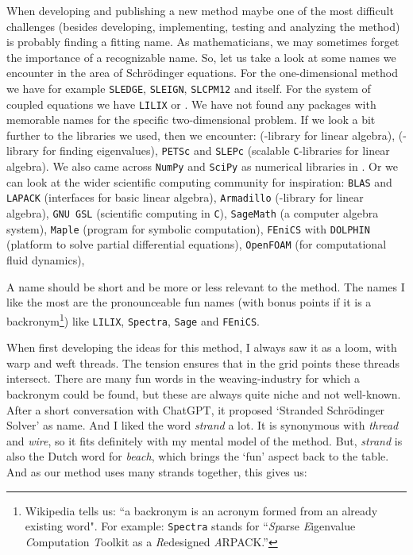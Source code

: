When developing and publishing a new method maybe one of the most difficult challenges (besides developing, implementing, testing and analyzing the method) is probably finding a fitting name. As mathematicians, we may sometimes forget the importance of a recognizable name. So, let us take a look at some names we encounter in the area of Schrödinger equations. For the one-dimensional method we have for example \texttt{SLEDGE}, \texttt{SLEIGN}, \texttt{SLCPM12} and \matslise{} itself. For the system of coupled equations we have \texttt{LILIX} or \matscs{}. We have not found any packages with memorable names for the specific two-dimensional problem. If we look a bit further to the libraries we used, then we encounter: \Eigen{} (\cpp{}-library for linear algebra), \spectra{} (\cpp{}-library for finding eigenvalues), \texttt{PETSc} and \texttt{SLEPc} (scalable \texttt{C}-libraries for linear algebra). We also came across \texttt{NumPy} and \texttt{SciPy} as numerical libraries in \lpython{}. Or we can look at the wider scientific computing community for inspiration: \texttt{BLAS} and \texttt{LAPACK} (interfaces for basic linear algebra), \texttt{Armadillo} (\cpp{}-library for linear algebra), \texttt{GNU GSL} (scientific computing in \texttt{C}), \texttt{SageMath} (a computer algebra system), \texttt{Maple} (program for symbolic computation), \texttt{FEniCS} with \texttt{DOLPHIN} (platform to solve partial differential equations), \texttt{OpenFOAM} (for computational fluid dynamics),

A name should be short and be more or less relevant to the method. The names I like the most are the pronounceable fun names (with bonus points if it is a backronym\footnote{Wikipedia tells us: ``a backronym is an acronym formed from an already existing word". For example: \texttt{Spectra} stands for ``\emph{Sp}arse \emph{E}igenvalue \emph{C}omputation \emph{T}oolkit as a \emph{R}edesigned \emph{A}RPACK.''}) like \texttt{LILIX}, \texttt{Spectra}, \texttt{Sage} and \texttt{FEniCS}.

When first developing the ideas for this method, I always saw it as a loom, with warp and weft threads. The tension ensures that in the grid points these threads intersect. There are many fun words in the weaving-industry for which a backronym could be found, but these are always quite niche and not well-known. After a short conversation with ChatGPT, it proposed `Stranded Schrödinger Solver' as name. And I liked the word \emph{strand} a lot. It is synonymous with \emph{thread} and \emph{wire}, so it fits definitely with my mental model of the method. But, \emph{strand} is also the Dutch word for \emph{beach}, which brings the `fun' aspect back to the table. And as our method uses many strands together, this gives us:

